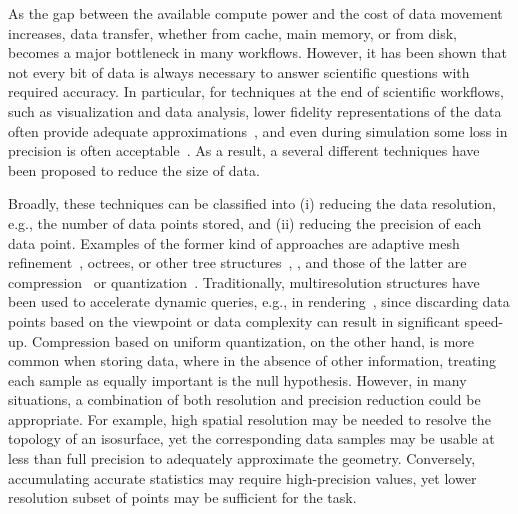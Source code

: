 As the gap between the available compute power and the cost of data movement
increases, data transfer, whether from cache, main memory, or from disk,
becomes a major bottleneck in many workflows. However, it has been shown that
not every bit of data is always necessary to answer scientific questions with
required accuracy. In particular, for techniques at the end of scientific
workflows, such as visualization and data analysis, lower fidelity
representations of the data often provide adequate
approximations~\cite{woodring2011,covra2012,compression_sim2013}, and even
during simulation some loss in precision is often
acceptable~\cite{compression_sim2013,doi:10.1177/1094342018762036}. As a
result, a several different techniques have been proposed to reduce the size
of data. 

Broadly, these techniques can be classified into (i) reducing the data
resolution, e.g., the number of data points stored, and (ii) reducing the
precision of each data point.  Examples of the former kind of approaches are
adaptive mesh refinement~\cite{amr1989}, octrees, or other tree
structures~\cite{hierarchical1984}, , and those of the
latter are compression~\cite{fpzip,isabela,zfp2014,sz} or
quantization~\cite{vq1992,compression_domain2003,sqe}. Traditionally,
multiresolution structures have been used to accelerate dynamic queries, e.g.,
in rendering~\cite{multires_octree1999}, since discarding data points based on
the viewpoint or data complexity can result in significant speed-up.
Compression based on uniform quantization, on the other hand, is more common
when storing data, where in the absence of other information, treating each
sample as equally important is the null hypothesis. However, in many
situations, a combination of both resolution and precision reduction could be
appropriate.  For example, high spatial resolution may be needed to resolve the
topology of an isosurface, yet the corresponding data samples may be usable at
less than full precision to adequately approximate the geometry.  Conversely,
accumulating accurate statistics may require high-precision values, yet
lower resolution subset of points may be sufficient for the task. 

